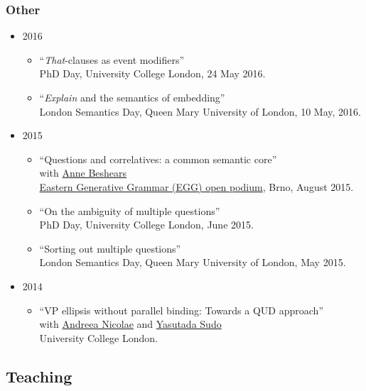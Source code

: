 \documentclass[]{article}
\providecommand{\tightlist}{%
  \setlength{\itemsep}{0pt}\setlength{\parskip}{0pt}}
\begin{document}
\subsubsection{Other}\label{other}

\begin{itemize}
\tightlist
\item
  2016

  \begin{itemize}
  \tightlist
  \item
    ``\emph{That}-clauses as event modifiers''\\
    PhD Day, University College London, 24 May 2016.
  \item
    ``\emph{Explain} and the semantics of embedding''\\
    London Semantics Day, Queen Mary University of London, 10 May, 2016.
  \end{itemize}
\item
  2015

  \begin{itemize}
  \tightlist
  \item
    ``Questions and correlatives: a common semantic core''\\
    with
    \href{http://linguistics.sllf.qmul.ac.uk/people/anne-beshears}{Anne
    Beshears}\\
    \href{...}{Eastern Generative Grammar (EGG) open podium}, Brno,
    August 2015.
  \item
    ``On the ambiguity of multiple questions''\\
    PhD Day, University College London, June 2015.
  \item
    ``Sorting out multiple questions''\\
    London Semantics Day, Queen Mary University of London, May 2015.
  \end{itemize}
\item
  2014

  \begin{itemize}
  \tightlist
  \item
    ``VP ellipsis without parallel binding: Towards a QUD approach''\\
    with \href{...}{Andreea Nicolae} and \href{...}{Yasutada Sudo}\\
    University College London.
  \end{itemize}
\end{itemize}

\subsection{Teaching}\label{teaching}
\end{document}
